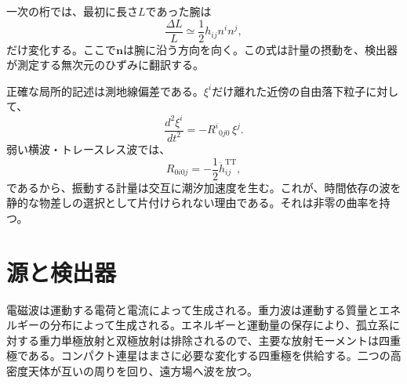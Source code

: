 一次の桁では、最初に長さ\(L\)であった腕は
\begin{equation}
 \frac{\Delta L}{L}\simeq\frac12 h_{ij}n^i n^j,
 \label{eq:fractional-strain}
\end{equation}
だけ変化する。ここで\(\mathbf n\)は腕に沿う方向を向く。この式は計量の摂動を、検出器が測定する無次元のひずみに翻訳する。

\begin{classroomqa}
\end{classroomqa}

正確な局所的記述は測地線偏差である。\(\xi^i\)だけ離れた近傍の自由落下粒子に対して、
\begin{equation}
 \frac{d^2\xi^i}{dt^2}
 =-R^i{}_{0j0}\,\xi^j.
 \label{eq:geodesic-deviation}
\end{equation}
弱い横波・トレースレス波では、
\begin{equation}
 R_{0i0j}=-\frac12\ddot h^{\mathrm{TT}}_{ij},
 \label{eq:tidal-curvature}
\end{equation}
であるから、振動する計量は交互に潮汐加速度を生む。これが、時間依存の波を静的な物差しの選択として片付けられない理由である。それは非零の曲率を持つ。

\begin{classroomqa}
\end{classroomqa}

\section{源と検出器}

電磁波は運動する電荷と電流によって生成される。重力波は運動する質量とエネルギーの分布によって生成される。エネルギーと運動量の保存により、孤立系に対する重力単極放射と双極放射は排除されるので、主要な放射モーメントは四重極である。コンパクト連星はまさに必要な変化する四重極を供給する。二つの高密度天体が互いの周りを回り、遠方場へ波を放つ。

